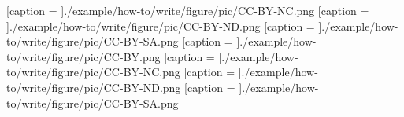 \begin{enumerate}
{    %
    {[caption = { }]{./example/how-to/write/figure/pic/CC-BY-NC.png}}%
    {[caption = { }]{./example/how-to/write/figure/pic/CC-BY-ND.png}}%
    {[caption = { }]{./example/how-to/write/figure/pic/CC-BY-SA.png}}%
    {[caption = { }]{./example/how-to/write/figure/pic/CC-BY.png}}%
    {[caption = { }]{./example/how-to/write/figure/pic/CC-BY-NC.png}}%
    {[caption = { }]{./example/how-to/write/figure/pic/CC-BY-ND.png}}%
    {[caption = { }]{./example/how-to/write/figure/pic/CC-BY-SA.png}}
  } %
  \end{enumerate}
\EndChapter

